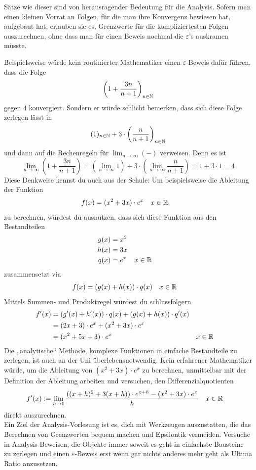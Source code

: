 \begin{bem}
    Sätze wie dieser sind von herausragender Bedeutung für die Analysis. Sofern man einen kleinen Vorrat an Folgen, für die man ihre Konvergenz bewiesen hat, aufgebaut hat, erlauben sie es, Grenzwerte für die kompliziertesten Folgen auszurechnen, ohne dass man für einen Beweis nochmal die $\varepsilon$'s auskramen müsste.
    
    Beispielsweise würde kein routinierter Mathematiker einen $\varepsilon$-Beweis dafür führen, dass die Folge
        \[ \left( 1 + \frac{3n}{n+1} \right)_{n\in \mathbb N} \]
    gegen $4$ konvergiert. Sondern er würde schlicht bemerken, dass sich diese Folge zerlegen lässt in
        \[ (1)_{n\in \mathbb N} + 3\cdot \left(\frac{n}{n+1}\right)_{n\in \mathbb N} \]
    und dann auf die Rechenregeln für $\lim_{n\to\infty}(-)$ verweisen. Denn es ist
        \[ \lim_{n\to \infty} \left( 1+ \frac{3n}{n+1} \right) = \left( \lim_{n\to \infty} 1 \right)+3\cdot \left( \lim_{n\to \infty} \frac{n}{n+1} \right) = 1+3\cdot 1 = 4 \]
    Diese Denkweise kennst du auch aus der Schule: Um beispielsweise die Ableitung der Funktion
    \begin{align*}
        f(x) &= (x^2+3x)\cdot e^x && x\in \mathbb R
    \end{align*}
    zu berechnen, würdest du ausnutzen, dass sich diese Funktion aus den Bestandteilen
    \begin{align*}
        g(x)& = x^2 \\
        h(x) & = 3x \\
        q(x) &= e^x && x\in \mathbb R
    \end{align*}
    zusammensetzt via
    \begin{align*}
        f(x) & = (g(x)+h(x))\cdot q(x) && x\in \mathbb R
    \end{align*}
    Mittels Summen- und Produktregel würdest du schlussfolgern
    \begin{align*}
        f'(x) & = (g'(x)+h'(x))\cdot q(x)  + (g(x)+h(x))\cdot q'(x) \\
        & = (2x+3)\cdot e^x + (x^2+3x)\cdot e^x \\
        & = (x^2+5x+3)\cdot e^x && x\in \mathbb R
    \end{align*}
    Die „analytische“ Methode, komplexe Funktionen in einfache Bestandteile zu zerlegen, ist auch an der Uni überlebensnotwendig. Kein erfahrener Mathematiker würde, um die Ableitung von $(x^2+3x)\cdot e^x$ zu berechnen, unmittelbar mit der Definition der Ableitung arbeiten und versuchen, den Differenzialquotienten
    \begin{align*}
        f'(x)&:=\lim_{h\to 0} \frac{((x+h)^2+3(x+h))\cdot e^{x+h} - (x^2+3x)\cdot e^{x}}{h} && x\in \mathbb R
    \end{align*}
    direkt auszurechnen. \\[0.5em]
    Ein Ziel der Analysis-Vorlesung ist es, dich mit Werkzeugen auszustatten, die das Berechnen von Grenzwerten bequem machen und Epsilontik vermeiden. Versuche in Analysis-Beweisen, die Objekte immer soweit es geht in einfachste Bausteine zu zerlegen und einen $\varepsilon$-Beweis erst wenn gar nichts anderes mehr geht als Ultima Ratio anzusetzen.
\end{bem}


